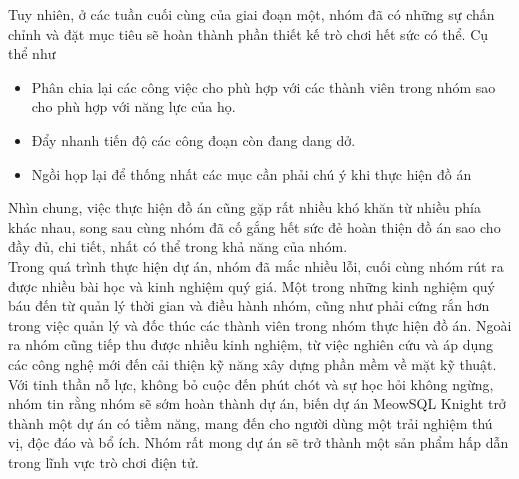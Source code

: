 \hspace*{1cm} Tuy nhiên, ở các tuần cuối cùng của giai đoạn một, nhóm đã có những sự chấn chỉnh và đặt mục tiêu sẽ hoàn thành phần thiết kế trò chơi hết sức có thể. Cụ thể như
\begin{itemize}
	\item Phân chia lại các công việc cho phù hợp với các thành viên trong nhóm sao cho phù hợp với năng lực của họ. 
	\item Đẩy nhanh tiến độ các công đoạn còn đang dang dở.
	\item Ngồi họp lại để thống nhất các mục cần phải chú ý khi thực hiện đồ án
\end{itemize}
\hspace*{1cm} Nhìn chung, việc thực hiện đồ án cũng gặp rất nhiều khó khăn từ nhiều phía khác nhau, song sau cùng nhóm đã cố gắng hết sức đẻ hoàn thiện đồ án sao cho đầy đủ, chi tiết, nhất có thể trong khả năng của nhóm.\\
\hspace*{1cm} Trong quá trình thực hiện dự án, nhóm đã mắc nhiều lỗi, cuối cùng nhóm rút ra được nhiều bài học và kinh nghiệm quý giá. Một trong những kinh nghiệm quý báu đến từ quản lý thời gian và điều hành nhóm, cũng như phải cứng rắn hơn trong việc quản lý và đốc thúc các thành viên trong nhóm thực hiện đồ án. Ngoài ra nhóm cũng tiếp thu được nhiều kinh nghiệm, từ việc nghiên cứu và áp dụng các công nghệ mới đến cải thiện kỹ năng xây dựng phần mềm về mặt kỹ thuật.\\

\hspace*{1cm} Với tinh thần nỗ lực, không bỏ cuộc đến phút chót và sự học hỏi không ngừng, nhóm tin rằng nhóm sẽ sớm hoàn thành dự án, biến dự án MeowSQL Knight trở thành một dự án có tiềm năng, mang đến cho người dùng một trải nghiệm thú vị, độc đáo và bổ ích. Nhóm rất mong dự án sẽ trở thành một sản phẩm hấp dẫn trong lĩnh vực trò chơi điện tử.
